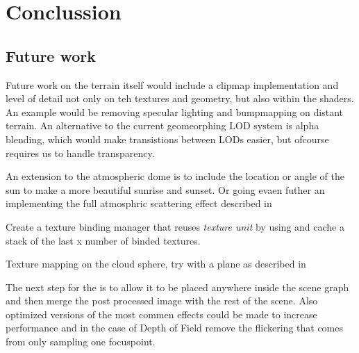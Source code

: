 
\chapter{Conclussion}








\section{Future work}

Future work on the terrain itself would include a clipmap
implementation and level of detail not only on teh textures and
geometry, but also within the shaders. An example would be removing
specular lighting and bumpmapping on distant terrain. An alternative
to the current geomeorphing LOD system is alpha blending, which would
make transistions between LODs easier, but ofcourse requires us to
handle transparency.



An extension to the atmospheric dome is to include the location or
angle of the sun to make a more beautiful sunrise and sunset.
Or going evaen futher an implementing the full atmosphric scattering
effect described in 

Create a texture binding manager that reuses \emph{texture unit} by
using   and cache
a stack of the last x number of binded textures.

Texture mapping on the cloud sphere, try with a plane as described in


The next step for the  is to allow it to be
placed anywhere inside the scene graph and then merge the post
processed image with the rest of the scene. Also optimized versions of
the most commen effects could be made to increase performance and in
the case of Depth of Field remove the flickering that comes from only
sampling one focuspoint.

